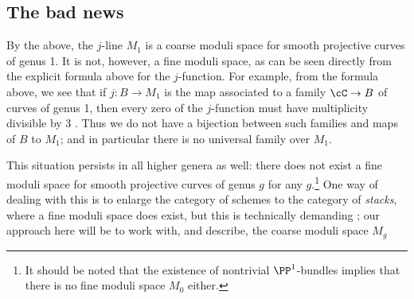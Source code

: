 \subsection{The bad news} 

By the above, the $j$-line $M_1$ is a coarse moduli space for smooth projective curves of genus 1. It is not, however, a fine moduli space, as can be seen directly from the explicit formula above for the $j$-function. For example, from the formula above, we see that if $j : B \to M_1$ is the map associated to a family $\cC \to B$ of curves of genus 1, then every zero of the $j$-function must have multiplicity divisible by 3 . Thus we do not have a bijection between such families and maps of $B$ to $M_1$; and in particular there is no universal family over $M_1$. 

This situation persists in all higher genera as well: there does not exist a fine moduli space for smooth projective curves of genus $g$ for any $g$.\footnote{It should be noted that the existence of nontrivial $\PP^1$-bundles implies that there is no fine moduli space $M_0$ either.} One way of dealing with this is to enlarge the category of schemes to the category of \emph{stacks}, where a fine moduli space does exist, but this is technically demanding ; our approach here will be to work with, and describe, the coarse moduli space $M_g$ 

